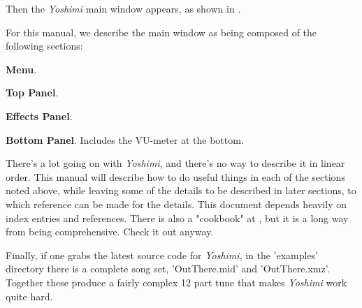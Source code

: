 \documentclass[
 11pt,
 twoside,
 a4paper,
 final                                 %
]{article}
\begin{document}
   Then the \textsl{Yoshimi} main window appears, as shown in
   .

   For this manual, we describe the main window as being composed of
   the following sections:

\begin{enumber}
   \item \textbf{Menu}.
   \item \textbf{Top Panel}.
   \item \textbf{Effects Panel}.
   \item \textbf{Bottom Panel}.  Includes the VU-meter at the bottom.
\end{enumber}

   There's a lot going on with \textsl{Yoshimi}, and there's no way to describe
   it in linear order.  This manual will describe how to do useful things in
   each of the sections noted above, while leaving some of the details to be
   described in later sections, to which reference can be made for the details.
   This document depends heavily on index entries and references.
   There is also a "cookbook" at \cite{book}, but it is a long way from being
   comprehensive.  Check it out anyway.

   Finally, if one grabs the latest source code for \textsl{Yoshimi}, in the
   'examples' directory there is a complete song set, 'OutThere.mid' and
   'OutThere.xmz'. Together these produce a fairly complex 12 part tune that
   makes \textsl{Yoshimi} work quite hard.

\rhead{\rightmark}         %





















\end{document}
